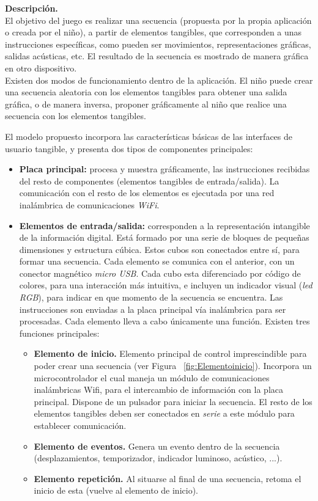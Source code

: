 \textbf{Descripción.}\\
El objetivo del juego es realizar una secuencia (propuesta por la propia aplicación o creada por el niño), a partir de elementos tangibles, que corresponden a unas instrucciones específicas, como pueden ser movimientos, representaciones gráficas, salidas acústicas, etc. El resultado de la secuencia es mostrado de manera gráfica en otro dispositivo.\\
Existen dos modos de funcionamiento dentro de la aplicación. El niño puede crear una secuencia aleatoria con los elementos tangibles para obtener una salida gráfica, o de manera inversa, proponer gráficamente al niño que realice una secuencia con los elementos tangibles.
 
El modelo propuesto incorpora las características básicas de las interfaces de usuario tangible, y presenta
dos tipos de componentes principales:
\begin{itemize}
\item \textbf{Placa principal:} procesa y muestra gráficamente, las instrucciones recibidas del resto de componentes (elementos tangibles de entrada/salida). La comunicación con el resto de los elementos es ejecutada por una red inalámbrica de comunicaciones \emph{WiFi}.
\item \textbf{Elementos de entrada/salida:} corresponden a la representación intangible de la información digital. 
Está formado por una serie de bloques de pequeñas dimensiones y estructura cúbica. Estos cubos son conectados
entre sí, para formar una secuencia. Cada elemento se comunica con el anterior, con un conector magnético \emph{micro USB}.
Cada cubo esta diferenciado por código de colores, para una interacción más intuitiva, e incluyen un indicador visual (\emph{led RGB}), para indicar en que momento de la secuencia se encuentra.
Las instrucciones son enviadas a la placa principal vía inalámbrica para ser procesadas.
Cada elemento lleva a cabo únicamente una función. Existen tres funciones principales:
\begin{itemize}
\item \textbf{Elemento de inicio.} Elemento principal de control imprescindible para poder crear una secuencia (ver Figura ~\ref{fig:Elementoinicio}).
Incorpora un microcontrolador el cual maneja un módulo de comunicaciones inalámbricas Wifi, para el intercambio de información con la placa principal.
Dispone de un pulsador para iniciar la secuencia.
El resto de los elementos tangibles deben ser conectados en \emph{serie} a este módulo para establecer comunicación.

\item \textbf{Elemento de eventos.} Genera un evento dentro de la secuencia (desplazamientos, temporizador, indicador luminoso, acústico, ...).
\item \textbf{Elemento repetición.} Al situarse al final de una secuencia, retoma el inicio de esta (vuelve al elemento de inicio).
\end{itemize}
\end{itemize}

